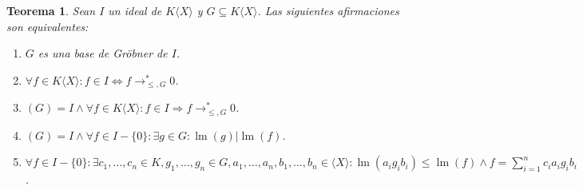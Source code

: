 \documentclass[12pt]{report}
\theoremstyle{customstyle}
\newtheorem{theorem}{Teorema}[chapter]
\theoremstyle{factstyle}
\DeclareMathOperator{\lm}{lm}
\begin{document}
\begin{theorem}\label{thm:equivalencias de base de Gröbner}
  Sean $I$ un ideal de $K⟨X⟩$ y $G ⊆ K⟨X⟩$. Las siguientes afirmaciones son equivalentes:
  \begin{enumerate}
    \item $G$ es una base de Gröbner de $I$. \label{thm:egb:1}

    \item $∀f ∈ K⟨X⟩ : f ∈ I ⇔ f →^*_{≤, G} 0$. \label{thm:egb:2}

    \item $(G) = I ∧ ∀f ∈ K⟨X⟩ : f ∈ I ⇒ f →^*_{≤, G} 0$. \label{thm:egb:3}

    \item $(G) = I ∧ ∀f ∈ I - \{0\} : ∃g ∈ G : \lm(g) | \lm(f)$. \label{thm:egb:4}

    \item $∀f ∈ I - \{0\} : ∃c_1, …, c_n ∈ K, g_1, …, g_n ∈ G, a_1, …, a_n, b_1, …, b_n ∈ ⟨X⟩ : \lm(a_i g_i b_i) ≤ \lm(f) ∧ f = ∑_{i = 1}^n c_i a_i g_i b_i$.  \label{thm:egb:5}
  \end{enumerate}
\end{theorem}
\end{document}
